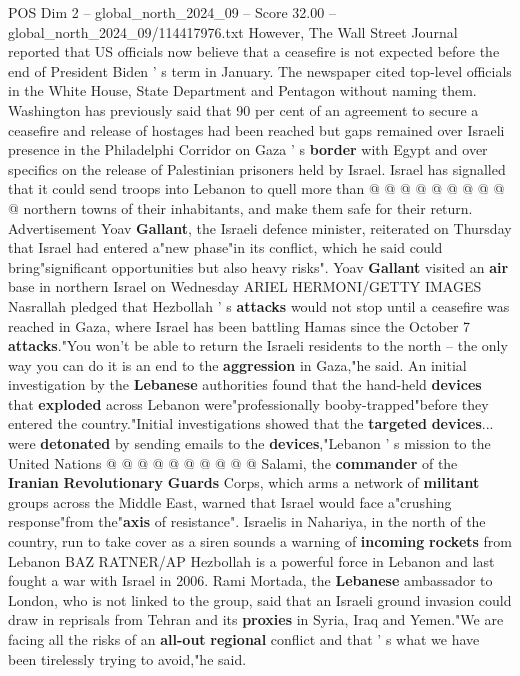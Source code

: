 \begin{textsample}{POS Dim 2 – global\_north\_2024\_09 – Score 32.00 – global\_north\_2024\_09/114417976.txt}
However, The Wall Street Journal reported that US officials now believe that a ceasefire is not expected before the end of President Biden ' s term in January.
The newspaper cited top-level officials in the White House, State Department and Pentagon without naming them.
Washington has previously said that 90 per cent of an agreement to secure a ceasefire and release of hostages had been reached but gaps remained over Israeli presence in the Philadelphi Corridor on Gaza ' s \textbf{border} with Egypt and over specifics on the release of Palestinian prisoners held by Israel.
Israel has signalled that it could send troops into Lebanon to quell more than @ @ @ @ @ @ @ @ @ @ northern towns of their inhabitants, and make them safe for their return.
Advertisement Yoav \textbf{Gallant}, the Israeli defence minister, reiterated on Thursday that Israel had entered a"new phase"in its conflict, which he said could bring"significant opportunities but also heavy risks".
Yoav \textbf{Gallant} visited an \textbf{air} base in northern Israel on Wednesday ARIEL HERMONI/GETTY IMAGES Nasrallah pledged that Hezbollah ' s \textbf{attacks} would not stop until a ceasefire was reached in Gaza, where Israel has been battling Hamas since the October 7 \textbf{attacks}."You won't be able to return the Israeli residents to the north -- the only way you can do it is an end to the \textbf{aggression} in Gaza,"he said.
An initial investigation by the \textbf{Lebanese} authorities found that the hand-held \textbf{devices} that \textbf{exploded} across Lebanon were"professionally booby-trapped"before they entered the country."Initial investigations showed that the \textbf{targeted} \textbf{devices}... were \textbf{detonated} by sending emails to the \textbf{devices},"Lebanon ' s mission to the United Nations @ @ @ @ @ @ @ @ @ @ Salami, the \textbf{commander} of the \textbf{Iranian} \textbf{Revolutionary} \textbf{Guards} Corps, which arms a network of \textbf{militant} groups across the Middle East, warned that Israel would face a"crushing response"from the"\textbf{axis} of resistance".
Israelis in Nahariya, in the north of the country, run to take cover as a siren sounds a warning of \textbf{incoming} \textbf{rockets} from Lebanon BAZ RATNER/AP Hezbollah is a powerful force in Lebanon and last fought a war with Israel in 2006.
Rami Mortada, the \textbf{Lebanese} ambassador to London, who is not linked to the group, said that an Israeli ground invasion could draw in reprisals from Tehran and its \textbf{proxies} in Syria, Iraq and Yemen."We are facing all the risks of an \textbf{all-out} \textbf{regional} conflict and that ' s what we have been tirelessly trying to avoid,"he said.

\end{textsample}

